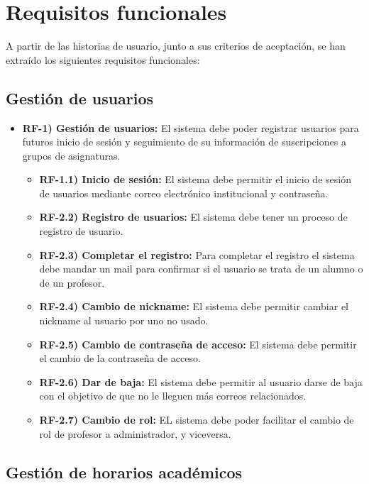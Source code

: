 \section{Requisitos funcionales}

A partir de las historias de usuario, junto a sus criterios de aceptación, se han extraído los siguientes requisitos funcionales:

\subsection{Gestión de usuarios}

\begin{itemize}
    \item \textbf{RF-1) Gestión de usuarios:} El sistema debe poder registrar usuarios para futuros inicio de sesión y seguimiento de su información de suscripciones a grupos de asignaturas.
    \begin{itemize}
        \item \textbf{RF-1.1) Inicio de sesión:} El sistema debe permitir el inicio de sesión de usuarios mediante correo electrónico institucional y contraseña.
        \item \textbf{RF-2.2) Registro de usuarios:} El sistema debe tener un proceso de registro de usuario.
        \item \textbf{RF-2.3) Completar el registro:} Para completar el registro el sistema debe mandar un mail para confirmar si el usuario se trata de un alumno o de un profesor.
        \item \textbf{RF-2.4) Cambio de nickname:} El sistema debe permitir cambiar el nickname al usuario por uno no usado.
        \item \textbf{RF-2.5) Cambio de contraseña de acceso:} El sistema debe permitir el cambio de la contraseña de acceso.
        \item \textbf{RF-2.6) Dar de baja:} El sistema debe permitir al usuario darse de baja con el objetivo de que no le lleguen más correos relacionados.
        \item \textbf{RF-2.7) Cambio de rol:} EL sistema debe poder facilitar el cambio de rol de profesor a administrador, y viceversa.
    \end{itemize}
\end{itemize}

\subsection{Gestión de horarios académicos}

